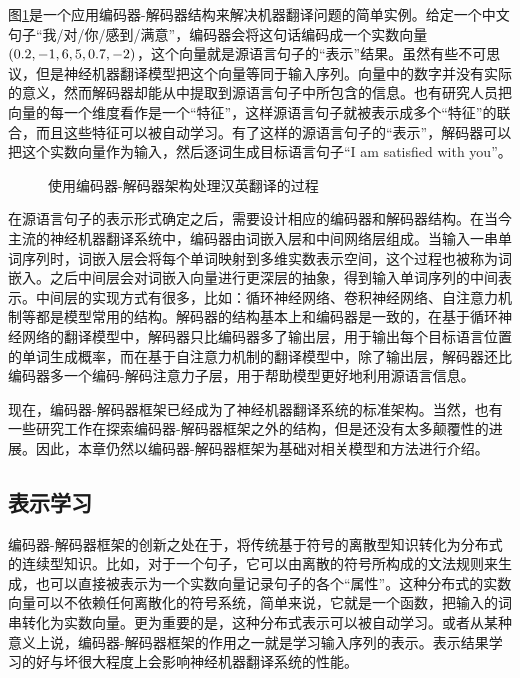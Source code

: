 \parinterval  图\ref{fig:10-5}是一个应用编码器-解码器结构来解决机器翻译问题的简单实例。给定一个中文句子“我/对/你/感到/满意”，编码器会将这句话编码成一个实数向量$(0.2, -1, 6, \\ 5, 0.7, -2)$，这个向量就是源语言句子的“表示”结果。虽然有些不可思议，但是神经机器翻译模型把这个向量等同于输入序列。向量中的数字并没有实际的意义，然而解码器却能从中提取到源语言句子中所包含的信息。也有研究人员把向量的每一个维度看作是一个“特征”，这样源语言句子就被表示成多个“特征”的联合，而且这些特征可以被自动学习。有了这样的源语言句子的“表示”，解码器可以把这个实数向量作为输入，然后逐词生成目标语言句子“I am satisfied with you”。

\begin{figure}[htp]
\centering

\caption{使用编码器-解码器架构处理汉英翻译的过程 }
\label{fig:10-5}
\end{figure}

\parinterval  在源语言句子的表示形式确定之后，需要设计相应的编码器和解码器结构。在当今主流的神经机器翻译系统中，编码器由词嵌入层和中间网络层组成。当输入一串单词序列时，词嵌入层会将每个单词映射到多维实数表示空间，这个过程也被称为词嵌入。之后中间层会对词嵌入向量进行更深层的抽象，得到输入单词序列的中间表示。中间层的实现方式有很多，比如：循环神经网络、卷积神经网络、自注意力机制等都是模型常用的结构。解码器的结构基本上和编码器是一致的，在基于循环神经网络的翻译模型中，解码器只比编码器多了输出层，用于输出每个目标语言位置的单词生成概率，而在基于自注意力机制的翻译模型中，除了输出层，解码器还比编码器多一个编码-解码注意力子层，用于帮助模型更好地利用源语言信息。

\parinterval  现在，编码器-解码器框架已经成为了神经机器翻译系统的标准架构。当然，也有一些研究工作在探索编码器-解码器框架之外的结构，但是还没有太多颠覆性的进展。因此，本章仍然以编码器-解码器框架为基础对相关模型和方法进行介绍。

\subsection{表示学习}

\parinterval 编码器-解码器框架的创新之处在于，将传统基于符号的离散型知识转化为分布式的连续型知识。比如，对于一个句子，它可以由离散的符号所构成的文法规则来生成，也可以直接被表示为一个实数向量记录句子的各个“属性”。这种分布式的实数向量可以不依赖任何离散化的符号系统，简单来说，它就是一个函数，把输入的词串转化为实数向量。更为重要的是，这种分布式表示可以被自动学习。或者从某种意义上说，编码器-解码器框架的作用之一就是学习输入序列的表示。表示结果学习的好与坏很大程度上会影响神经机器翻译系统的性能。

